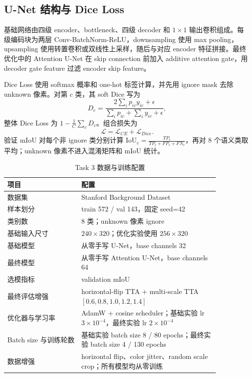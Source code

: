 \documentclass[lang=cn,a4paper,newtx,code=minted]{elegantpaper}
\begin{document}
\subsection{U-Net 结构与 Dice Loss}

基础网络由四级 encoder、bottleneck、四级 decoder 和 $1\times1$ 输出卷积组成。每级编码块为两层 Conv-BatchNorm-ReLU，downsampling 使用 max pooling，upsampling 使用转置卷积或双线性上采样，随后与对应 encoder 特征拼接。最终优化中的 Attention U-Net 在 skip connection 前加入 additive attention gate，用 decoder gate feature 过滤 encoder skip feature。

Dice Loss 使用 softmax 概率和 one-hot 标签计算，并先用 ignore mask 去除 unknown 像素。对第 $c$ 类，其 soft Dice 写为
\[
D_c=\frac{2\sum_i p_{ic}y_{ic}+\epsilon}{\sum_i p_{ic}+\sum_i y_{ic}+\epsilon},
\]
整体 Dice Loss 为 $1-\frac{1}{C}\sum_c D_c$。组合损失为
\[
\mathcal{L}=\mathcal{L}_{CE}+\mathcal{L}_{Dice}.
\]
验证 mIoU 对每个非 ignore 类分别计算 $\mathrm{IoU}_c=\frac{TP_c}{TP_c+FP_c+FN_c}$，再对 8 个语义类取平均；unknown 像素不进入混淆矩阵和 mIoU 统计。

\begin{table}[!htbp]
\centering
\small
\caption{Task 3 数据与训练配置}
\label{tab:task3-config}
\begin{tabular}{@{}L{0.30\linewidth}L{0.56\linewidth}@{}}
\toprule
项目 & 配置 \\
\midrule
数据集 & Stanford Background Dataset \\
样本划分 & train 572 / val 143，固定 seed=42 \\
类别数 & 8 类；unknown 像素 ignore \\
基础输入尺寸 & $240\times320$；优化实验使用 $256\times320$ \\
基础模型 & 从零手写 U-Net，base channels 32 \\
最终模型 & 从零手写 Attention U-Net，base channels 64 \\
选模指标 & validation mIoU \\
最终评估增强 & horizontal-flip TTA + multi-scale TTA $[0.6,0.8,1.0,1.2,1.4]$ \\
优化器与学习率 & AdamW + cosine scheduler；基础实验 lr $3\times10^{-4}$，最终实验 lr $2\times10^{-4}$ \\
Batch size 与训练轮数 & 基础实验 batch size 8 / 80 epochs；最终实验 batch size 4 / 130 epochs \\
数据增强 & horizontal flip、color jitter、random scale crop；所有模型均从零训练 \\
\bottomrule
\end{tabular}
\end{table}
\end{document}

